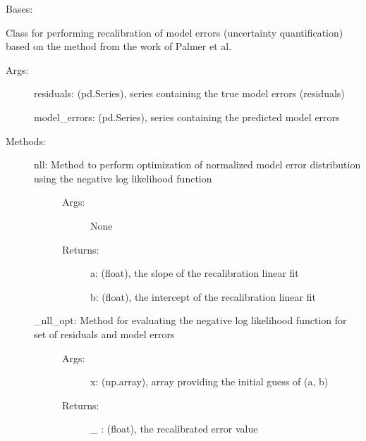 \documentclass[letterpaper,10pt,english]{sphinxmanual}
\begin{document}
\begin{fulllineitems}
\label{\detokenize{api/mastml.error_analysis.CorrectionFactors:mastml.error_analysis.CorrectionFactors}}
Bases: 

Class for performing recalibration of model errors (uncertainty quantification) based on the method from the
work of Palmer et al.
\begin{description}
\item[{Args:}] \leavevmode
residuals: (pd.Series), series containing the true model errors (residuals)

model\_errors: (pd.Series), series containing the predicted model errors

\item[{Methods:}] \leavevmode\begin{description}
\item[{nll: Method to perform optimization of normalized model error distribution using the negative log likelihood function}] \leavevmode\begin{description}
\item[{Args:}] \leavevmode
None

\item[{Returns:}] \leavevmode
a: (float), the slope of the recalibration linear fit

b: (float), the intercept of the recalibration linear fit

\end{description}

\item[{\_nll\_opt: Method for evaluating the negative log likelihood function for set of residuals and model errors}] \leavevmode\begin{description}
\item[{Args:}] \leavevmode
x: (np.array), array providing the initial guess of (a, b)

\item[{Returns:}] \leavevmode
\_ : (float), the recalibrated error value

\end{description}

\end{description}

\end{description}

\end{fulllineitems}
\end{document}
